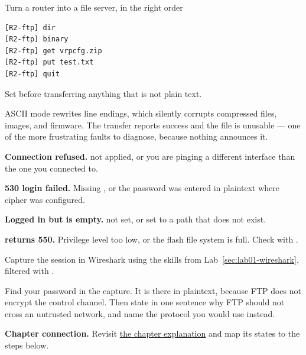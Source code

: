 \begin{labproject}{Turn a router into a file server, in the right order}
\begin{lstlisting}[style=utpterminal]
[R2-ftp] dir
[R2-ftp] binary
[R2-ftp] get vrpcfg.zip
[R2-ftp] put test.txt
[R2-ftp] quit
\end{lstlisting}

\begin{pitfall}
Set  before transferring anything that is not plain text.

ASCII mode rewrites line endings, which silently corrupts compressed files, images, and firmware. The transfer reports success and the file is unusable --- one of the more frustrating faults to diagnose, because nothing announces it.
\end{pitfall}

\begin{troubleshoot}
\textbf{Connection refused.}  not applied, or you are pinging a different interface than the one you connected to.

\textbf{530 login failed.} Missing , or the password was entered in plaintext where cipher was configured.

\textbf{Logged in but  is empty.}  not set, or set to a path that does not exist.

\textbf{ returns 550.} Privilege level too low, or the flash file system is full. Check with .
\end{troubleshoot}

\begin{tryit}
Capture the session in Wireshark using the skills from Lab~\ref{sec:lab01-wireshark}, filtered with .

Find your password in the capture. It is there in plaintext, because FTP does not encrypt the control channel. Then state in one sentence why FTP should not cross an untrusted network, and name the protocol you would use instead.
\end{tryit}
\end{labproject}

\textbf{Chapter connection.} Revisit \hyperref[ch:ftp]{the chapter explanation} and map its states to the steps below.



